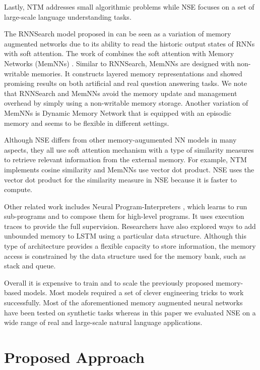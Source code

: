 \documentclass{article}
\begin{document}
Lastly, NTM addresses small algorithmic problems while NSE focuses on a set of large-scale language understanding tasks.

The RNNSearch model proposed in \cite{bahdanau:15} can be seen as a variation of memory augmented networks due to its ability to read the historic output states of RNNs with soft attention. The work of \cite{sukhbaatar2015end} combines the soft attention with Memory Networks (MemNNs) \cite{weston:15}. Similar to RNNSearch, MemNNs are designed with non-writable memories. It constructs layered memory representations and showed promising results on both artificial and real question answering tasks. We note that RNNSearch and MemNNs avoid the memory update and management overhead by simply using a non-writable memory storage. Another variation of MemNNs is Dynamic Memory Network \cite{ankit16} that is equipped with an episodic memory and seems to be flexible in different settings.

Although NSE differs from other memory-augumented NN models in many aspects, they all use soft attention mechanism with a type of similarity measures to retrieve relevant information from the external memory. For example, NTM implements cosine similarity and MemNNs use vector dot product. NSE uses the vector dot product for the similarity measure in NSE because it is faster to compute.



Other related work includes Neural Program-Interpreters \cite{reed2015neural}, which learns to run sub-programs and to compose them for high-level programs. It uses execution traces to provide the full supervision. Researchers have also explored ways to add unbounded memory to LSTM \cite{grefenstette2015learning} using a particular data structure. Although this type of architecture provides a flexible capacity to store information, the memory access is constrained by the data structure used for the memory bank, such as stack and queue.

Overall it is expensive to train and to scale the previously proposed memory-based models. Most models required a set of clever engineering tricks to work successfully. 
Most of the aforementioned memory augmented neural networks have been tested on synthetic tasks whereas in this paper we evaluated NSE on a wide range of real and large-scale natural language applications.

\section{Proposed Approach}
\end{document}
